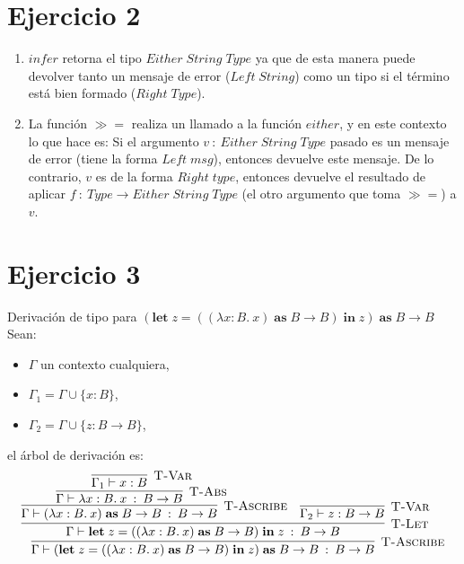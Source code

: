 \documentclass[a4paper]{report}
\begin{document}
\section*{Ejercicio 2}
\begin{enumerate}
\item $infer$ retorna el tipo $Either\; String\; Type$ ya que de esta
        manera puede devolver tanto un mensaje de error ($Left\; String$)
        como un tipo si el t\'ermino est\'a bien formado ($Right\; Type$).
\item La funci\'on $\gg =$ realiza un llamado a la funci\'on $either$, y en
        este contexto lo que hace es: Si el argumento $v\: :\: Either\;
        String\; Type$ pasado es un mensaje de error (tiene la forma
        $Left\; msg$), entonces devuelve este mensaje. De lo contrario,
        $v$ es de la forma $Right\; type$, entonces devuelve el resultado
        de aplicar $f\: :\: Type\rightarrow Either\; String\; Type$ (el
        otro argumento que toma $\gg =$) a $v$.
\end{enumerate}




\section*{Ejercicio 3}
Derivaci\'on de tipo para $(\textbf{let}\; z = ((\lambda x:B.\: x)\;
\textbf{as}\; B\rightarrow B)\; \textbf{in}\; z)\; \textbf{as}\;
B\rightarrow B$ \\
Sean:
\begin{itemize}
    \item $\Gamma$ un contexto cualquiera,
    \item $\Gamma_{1} = \Gamma \cup \{ x:B\}$,
    \item $\Gamma_{2} = \Gamma \cup \{ z:B\rightarrow B\}$,
\end{itemize}
el \'arbol de derivaci\'on es:
$$ \infer[\textsc{T-Ascribe}]
         {\Gamma \vdash (\textbf{let}\; z = ((\lambda x:B.\: x)\;
          \textbf{as}\; B\rightarrow B)\; \textbf{in}\; z)\;
          \textbf{as}\; B\rightarrow B\: :\: B\rightarrow B}
         {\infer[\textsc{T-Let}]
                {\Gamma \vdash \textbf{let}\; z = ((\lambda x:B.\:
                 x)\; \textbf{as}\; B\rightarrow B)\; \textbf{in}\;
                 z\: :\: B\rightarrow B}
                {\infer[\textsc{T-Ascribe}]
                       {\Gamma \vdash (\lambda x:B.\: x)\;
                        \textbf{as}\; B\rightarrow B\: :\:
                        B \rightarrow B}
                       {\infer[\textsc{T-Abs}]
                              {\Gamma \vdash \lambda x:B.\: x\:
                               :\: B\rightarrow B}
                              {\infer[\textsc{T-Var}]
                                     {\Gamma_{1} \vdash x:B}{}}
                       }
                 & \infer[\textsc{T-Var}]
                         {\Gamma_{2} \vdash z:B\rightarrow B}{}}
         }
$$
       
\end{document}

